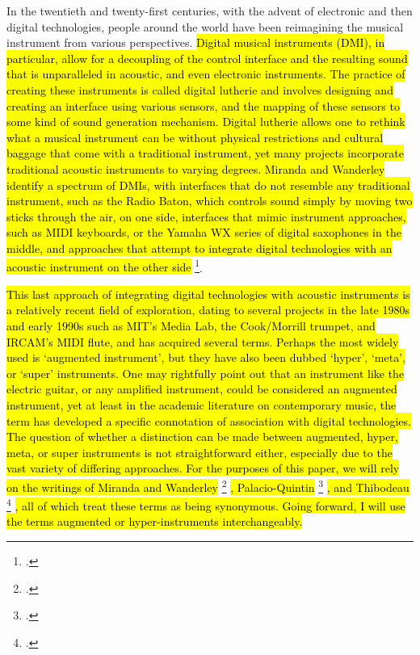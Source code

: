 \documentclass[12pt,twoside,maitrise]{dms_ks}
\theoremstyle{definition}
\begin{document}
{In the twentieth and twenty-first centuries, with the advent of electronic and then digital technologies, people around the world have been reimagining the musical instrument from various perspectives. 
\hl{Digital musical instruments (DMI), in particular, allow for a decoupling of the control interface and the resulting sound that is unparalleled in acoustic, and even electronic instruments.
The practice of creating these instruments is called digital lutherie and involves designing and creating an interface using various sensors, and the mapping of these sensors to some kind of sound generation mechanism.
Digital lutherie allows one to rethink what a musical instrument can be without physical restrictions and cultural baggage that come with a traditional instrument, yet many projects incorporate traditional acoustic instruments to varying degrees. 
Miranda and Wanderley identify a spectrum of DMIs, with interfaces that do not resemble any traditional instrument, such as the Radio Baton, which controls sound simply by moving two sticks through the air, on one side, interfaces that mimic instrument approaches, such as MIDI keyboards, or the Yamaha WX series of digital saxophones in the middle, and approaches that attempt to integrate digital technologies with an acoustic instrument on the other side} \footcite[19-20]{miranda_new_2006}.


\hl{This last approach of integrating digital technologies with acoustic instruments is a relatively recent field of exploration, dating to several projects in the late 1980s and early 1990s such as MIT's Media Lab, the Cook/Morrill trumpet, and IRCAM's MIDI flute, and has acquired several terms.
Perhaps the most widely used is `augmented instrument', but they have also been dubbed `hyper', `meta', or `super' instruments.
One may rightfully point out that an instrument like the electric guitar, or any amplified instrument, could be considered an augmented instrument, yet at least in the academic literature on contemporary music, the term has developed a specific connotation of association with digital technologies. 
The question of whether a distinction can be made between augmented, hyper, meta, or super instruments is not straightforward either, especially due to the vast variety of differing approaches.
For the purposes of this paper, we will rely on the writings of Miranda and Wanderley} \footcite[21]{miranda_new_2006} \hl{, Palacio-Quintin} \footcite[25]{palacio-quintin_composition_2012-1} \hl{, and Thibodeau } \footcite[1]{thibodeau_trumpet_2011} \hl{, all of which treat these terms as being synonymous.
Going forward, I will use the terms augmented or hyper-instruments interchangeably.}

}
\end{document}
